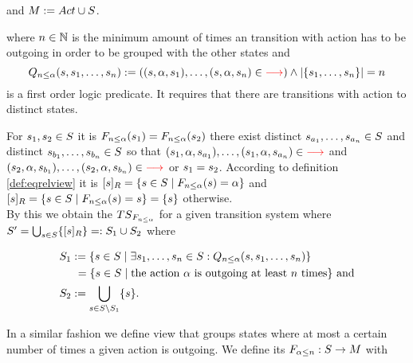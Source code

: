 \documentclass[preview]{standalone}
\begin{document}
and ${{M}} := {{Act} \cup {S}}$.
 
where ${n} \in {\mathbb{N}}$ is the minimum amount of times an transition with action \action has to be outgoing in order to be grouped with the other states and 
\[
	{Q_{{n}\leq{\alpha}}({s},{s}_1, \dots, {s}_{{n}})} := (({s}, {\alpha}, {s}_1), \dots, ({s}, {\alpha}, {s}_{n}) \in {\color{red}\ensuremath{{\longrightarrow}}}) \land |\{{s}_1, \dots, {s}_{n}\}| = {n}
\]
is a first order logic predicate. It requires that there are transitions with action \action to \numoutact distinct states.

For ${s}_1,{s}_2 \in {S}$ it is ${{{{F}}_{{n}\leq{\alpha}}}}({s}_1) = {{{{F}}_{{n}\leq{\alpha}}}}({s}_2)$ \iffN there exist distinct ${s}_{a_1}, \dots, {s}_{a_{n}} \in {S}$ and distinct ${s}_{b_1}, \dots, {s}_{b_{n}} \in {S}$ so that $({s}_1, {\alpha}, {s}_{a_1}), \dots, ({s}_1, {\alpha}, {s}_{a_{n}}) \in {\color{red}\ensuremath{{\longrightarrow}}}$ and $({s}_2, {\alpha}, {s}_{b_1}), \dots, ({s}_2, {\alpha}, {s}_{b_{n}}) \in {\color{red}\ensuremath{{\longrightarrow}}}$ or ${s}_1 = {s}_2$. According to definition \ref{def:eqrelview} it is $\eqclassv{\state} = \{\state \in \states \mid \gfctminoutaction(\state) = \action\}$ and $\eqclassv{\state} = \{\state \in \states \mid \gfctminoutaction(\state) = \state\} = \{\state\}$ otherwise. \\
By this we obtain the \viewN ${{{TS}_{{{{F}}_{{n}\leq{\alpha}}}}}}$ for a given transition system \ts where ${S}' = \bigcup_{{s} \in {S}} \{{{[{s}]_{{R}}}}\} =: {S}_1 \cup {S}_2$ where 

\begin{align*}
	\states_1 &:= \{\state \in \states \mid \exists \state_1, \dots, \state_\numoutact \in \states: \predminoutact\} \\ %
	&\hspace{1.15mm}= \{\state \in \states \mid \text{the action } \action \text{ is outgoing at least } \numoutact \text{ times} \} \text{ and} \\
	\states_2 &:= \bigcup_{\state \in \states \setminus \states_1}\{\state\}.	
\end{align*}

In a similar fashion we define view that groups states where at most a certain number of times a given action is outgoing. We define its \grpfctN ${{{{F}}_{{\alpha}\leq{n}}}} : {S} \to {M}$ with
\end{document}
